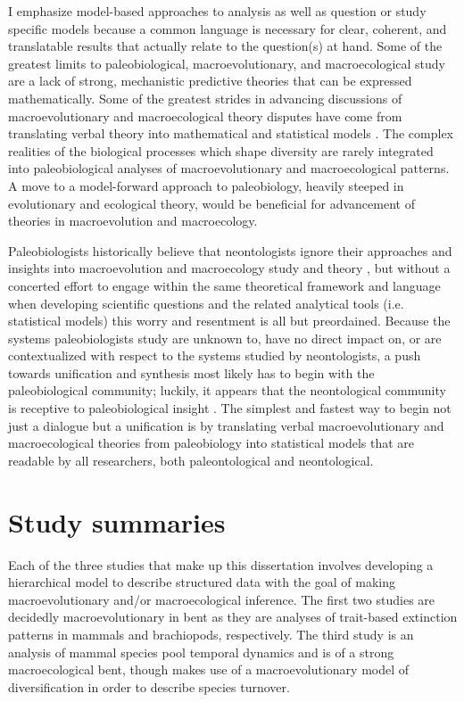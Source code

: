 I emphasize model-based approaches to analysis as well as question or study specific models because a common language is necessary for clear, coherent, and translatable results that actually relate to the question(s) at hand. Some of the greatest limits to paleobiological, macroevolutionary, and macroecological study are a lack of strong, mechanistic predictive theories that can be expressed mathematically. Some of the greatest strides in advancing discussions of macroevolutionary and macroecological theory disputes have come from translating verbal theory into mathematical and statistical models \citep{Raup1973,Nee1992,Felsenstein1985b,Hunt2006a,Hunt2007a,Shipley2006}. The complex realities of the biological processes which shape diversity are rarely integrated into paleobiological analyses of macroevolutionary and macroecological patterns. A move to a model-forward approach to paleobiology, heavily steeped in evolutionary and ecological theory, would be beneficial for advancement of theories in macroevolution and macroecology. 

Paleobiologists historically believe that neontologists ignore their approaches and insights into macroevolution and macroecology study and theory \citep{Sepkoski2009,Sepkoski2015}, but without a concerted effort to engage within the same theoretical framework and language when developing scientific questions and the related analytical tools (i.e. statistical models) this worry and resentment is all but preordained. Because the systems paleobiologists study are unknown to, have no direct impact on, or are contextualized with respect to the systems studied by neontologists, a push towards unification and synthesis most likely has to begin with the paleobiological community; luckily, it appears that the neontological community is receptive to paleobiological insight \citep{Fritz2013a}. The simplest and fastest way to begin not just a dialogue but a unification is by translating verbal macroevolutionary and macroecological theories from paleobiology into statistical models that are readable by all researchers, both paleontological and neontological.


\section{Study summaries}  %

Each of the three studies that make up this dissertation involves developing a hierarchical model to describe structured data with the goal of making macroevolutionary and/or macroecological inference. The first two studies are decidedly macroevolutionary in bent as they are analyses of trait-based extinction patterns in mammals and brachiopods, respectively. The third study is an analysis of mammal species pool temporal dynamics and is of a strong macroecological bent, though makes use of a macroevolutionary model of diversification in order to describe species turnover.

